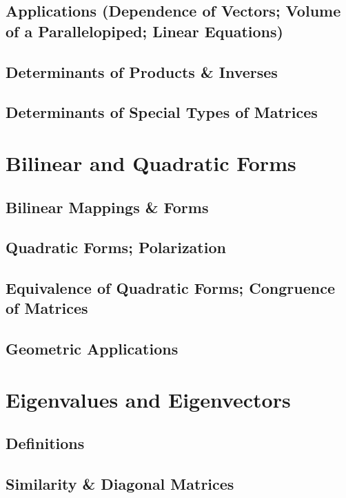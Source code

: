 \documentclass[11pt]{article}
\theoremstyle{definition}
\theoremstyle{plain}
\theoremstyle{remark}
\begin{document}
\subsection{Applications (Dependence of Vectors; Volume of a Parallelopiped; Linear Equations)}

\subsection{Determinants of Products \& Inverses}

\subsection{Determinants of Special Types of Matrices}

\section{Bilinear and Quadratic Forms}

\subsection{Bilinear Mappings \& Forms}

\subsection{Quadratic Forms; Polarization}

\subsection{Equivalence of Quadratic Forms; Congruence of Matrices}

\subsection{Geometric Applications}

\section{Eigenvalues and Eigenvectors}

\subsection{Definitions}

\subsection{Similarity \& Diagonal Matrices}
\end{document}
